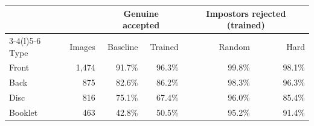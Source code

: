 \setlength{\tabcolsep}{4pt}
\begin{tabular}{@{}lrrrrr@{}}
\toprule
 & & \multicolumn{2}{c}{Genuine accepted} & \multicolumn{2}{c}{Impostors rejected (trained)} \\
\cmidrule(lr){3-4}\cmidrule(l){5-6}
Type & Images & Baseline & Trained & Random & Hard \\
\midrule
Front & 1,474 & 91.7\% & 96.3\% & 99.8\% & 98.1\% \\
Back & 875 & 82.6\% & 86.2\% & 98.3\% & 96.3\% \\
Disc & 816 & 75.1\% & 67.4\% & 96.0\% & 85.4\% \\
Booklet & 463 & 42.8\% & 50.5\% & 95.2\% & 91.4\% \\
\bottomrule
\end{tabular}

